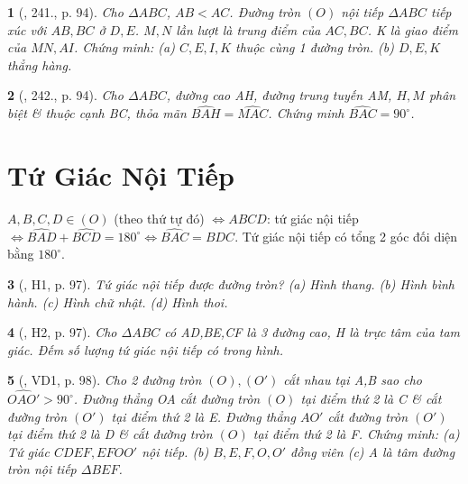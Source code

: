 \documentclass{article}
\newtheorem{baitoan}{}
\begin{document}
\begin{baitoan}[\cite{Binh_Toan_9_tap_2}, 241., p. 94]
	Cho $\Delta ABC$, $AB < AC$. Đường tròn $(O)$ nội tiếp $\Delta ABC$ tiếp xúc với $AB,BC$ ở $D,E$. $M,N$ lần lượt là trung điểm của $AC,BC$. K là giao điểm của $MN,AI$. Chứng minh: (a) $C,E,I,K$ thuộc cùng 1 đường tròn. (b) $D,E,K$ thẳng hàng.
\end{baitoan}

\begin{baitoan}[\cite{Binh_Toan_9_tap_2}, 242., p. 94]
	Cho $\Delta ABC$, đường cao AH, đường trung tuyến AM, $H,M$ phân biệt \& thuộc cạnh BC, thỏa mãn $\widehat{BAH} = \widehat{MAC}$. Chứng minh $\widehat{BAC} = 90^\circ$.
\end{baitoan}


\section{Tứ Giác Nội Tiếp}
 $A,B,C,D\in(O)$ (theo thứ tự đó) $\Leftrightarrow ABCD$: tứ giác nội tiếp $\Leftrightarrow\widehat{BAD} + \widehat{BCD} = 180^\circ\Leftrightarrow\widehat{BAC} = \widehat{BDC}$.  Tứ giác nội tiếp có tổng 2 góc đối diện bằng $180^\circ$.

\begin{baitoan}[\cite{Binh_boi_duong_Toan_9_tap_2}, H1, p. 97]
	Tứ giác nội tiếp được đường tròn? (a) Hình thang. (b) Hình bình hành. (c) Hình chữ nhật. (d) Hình thoi.
\end{baitoan}

\begin{baitoan}[\cite{Binh_boi_duong_Toan_9_tap_2}, H2, p. 97]
	Cho $\Delta ABC$ có AD,BE,CF là 3 đường cao, H là trực tâm của tam giác. Đếm số lượng tứ giác nội tiếp có trong hình.
\end{baitoan}

\begin{baitoan}[\cite{Binh_boi_duong_Toan_9_tap_2}, VD1, p. 98]
	Cho 2 đường tròn $(O),(O')$ cắt nhau tại A,B sao cho $\widehat{OAO'} > 90^\circ$. Đường thẳng OA cắt đường tròn $(O)$ tại điểm thứ 2 là C \& cắt đường tròn $(O')$ tại điểm thứ 2 là E. Đường thẳng $AO'$ cắt đường tròn $(O')$ tại điểm thứ 2 là D \& cắt đường tròn $(O)$ tại điểm thứ 2 là F. Chứng minh: (a) Tứ giác $CDEF,EFOO'$ nội tiếp. (b) $B,E,F,O,O'$ đồng viên (c) A là tâm đường tròn nội tiếp $\Delta BEF$.
\end{baitoan}
\end{document}
